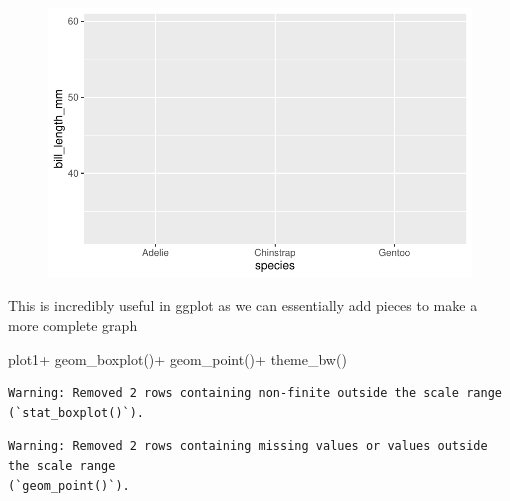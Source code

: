 \documentclass[
  letterpaper,
  DIV=11,
  numbers=noendperiod]{scrartcl}
\newenvironment{Shaded}{\begin{snugshade}}{\end{snugshade}}
\newcommand{\FunctionTok}[1]{\textcolor[rgb]{0.28,0.35,0.67}{#1}}
\newcommand{\NormalTok}[1]{\textcolor[rgb]{0.00,0.23,0.31}{#1}}
\newcommand{\SpecialCharTok}[1]{\textcolor[rgb]{0.37,0.37,0.37}{#1}}
\begin{document}
\begin{figure}[H]

{\centering \includegraphics{Lab_2_files/figure-pdf/unnamed-chunk-4-1.pdf}

}

\end{figure}

This is incredibly useful in ggplot as we can essentially add pieces to
make a more complete graph

\begin{Shaded}
\begin{Highlighting}[]
\NormalTok{plot1}\SpecialCharTok{+}
  \FunctionTok{geom\_boxplot}\NormalTok{()}\SpecialCharTok{+}
  \FunctionTok{geom\_point}\NormalTok{()}\SpecialCharTok{+}
  \FunctionTok{theme\_bw}\NormalTok{()}
\end{Highlighting}
\end{Shaded}

\begin{verbatim}
Warning: Removed 2 rows containing non-finite outside the scale range
(`stat_boxplot()`).
\end{verbatim}

\begin{verbatim}
Warning: Removed 2 rows containing missing values or values outside the scale range
(`geom_point()`).
\end{verbatim}
\end{document}

